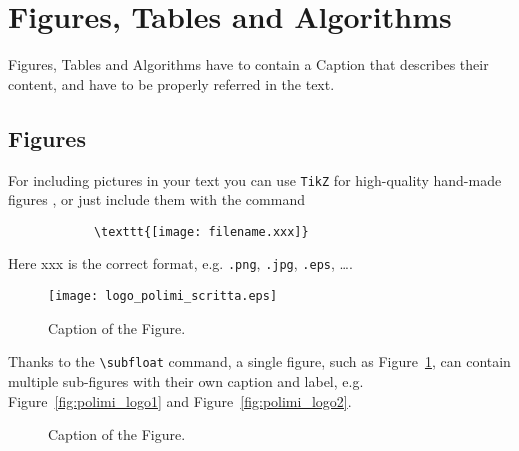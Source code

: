 \documentclass[11pt,a4paper]{article}
\begin{document}
\section{Figures, Tables and Algorithms}

    Figures, Tables and Algorithms have to contain a Caption that describes their content, and have to be properly referred in the text.

    \subsection{Figures} \label{subsec:figures}

        For including pictures in your text you can use \texttt{TikZ} for high-quality hand-made figures \cite{tikz}, or just include them with the command

        \begin{verbatim}
            \texttt{[image: filename.xxx]}
        \end{verbatim}

        Here xxx is the correct format, e.g.  \verb|.png|, \verb|.jpg|, \verb|.eps|, \dots.

        \begin{figure}[H]
            \centering
            \texttt{[image: logo\_polimi\_scritta.eps]}
            \caption{Caption of the Figure.}
            \label{fig:quadtree}
        \end{figure}

        Thanks to the \texttt{\textbackslash subfloat} command, a single figure, such as Figure~\ref{fig:quadtree}, can contain multiple sub-figures with their own caption and label, e.g. Figure~\ref{fig:polimi_logo1} and Figure~\ref{fig:polimi_logo2}. 

        \begin{figure}[H]
            \centering
            \quad
            \caption[]{Caption of the Figure.}
            \label{fig:quadtree2}
        \end{figure}
\end{document}
